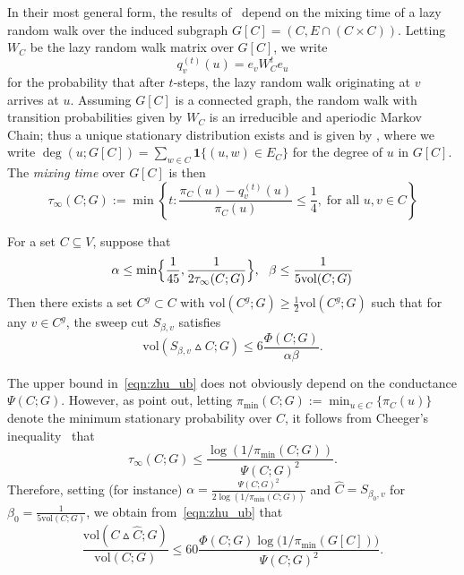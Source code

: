 \documentclass[11pt,twoside]{article}
\newcommand{\set}[1]{\left\{#1\right\}}
\newcommand{\1}{\mathbf{1}}
\newcommand{\wh}[1]{\widehat{#1}}
\newcommand{\vol}{\mathrm{vol}}
\begin{document}
In their most general form, the results of~\citet{zhu2013} depend on the mixing time of a lazy random walk over the induced subgraph $G[C] = (C, E \cap (C \times C))$. Letting 
$W_C$ be the lazy random walk matrix over $G[C]$, we write  
\begin{equation*}
q_{v}^{(t)}(u) = e_vW_C^t e_u
\end{equation*}
for the probability that after $t$-steps, the lazy random walk originating at $v$ arrives at $u$. Assuming $G[C]$ is a connected graph, the random walk with transition probabilities given by $W_C$ is an irreducible and aperiodic Markov Chain; thus a unique stationary distribution exists and is given by \smash{$\pi_C(u) := \deg(u;G[C])/\vol(C;
	G[C])$}, where we write $\deg(u;G[C]) = \sum_{w \in C} \1\{(u,w) \in E_C\}$ for
the degree of $u$ in $G[C]$. The \emph{mixing time} over $G[C]$ is then
\begin{equation}
\label{eqn:mixing_time}
\tau_{\infty}(C;G) := \min\set{ t: \frac{\pi_C(u) - q_{v}^{(t)}(u)}
	{\pi_C(u)} \leq \frac{1}{4}, \; \text{for all $u,v \in C$}}
\end{equation}
\begin{lemma}
	\label{lem:zhu}
	For a set $C \subseteq V$, suppose that
	\begin{equation}
	\label{eqn:zhu_condition}
	\alpha \leq \min\Bigl\{\frac{1}{45}, \frac{1}{2\tau_{\infty}(C;G)}\Bigr\},~~ \beta \leq \frac{1}{5\vol(C;G)}
	\end{equation}
	Then there exists a set $C^g \subset C$ with $\vol(C^g;G) \geq \frac{1}{2}\vol(C^g;G)$ such that for any $v \in C^g$, the sweep cut $S_{\beta,v}$ satisfies
	\begin{equation}
	\label{eqn:zhu_ub}
	\vol(S_{\beta,v} \vartriangle C;G) \leq 6\frac{\Phi(C;G)}{\alpha \beta}.
	\end{equation}
\end{lemma}
The upper bound in~\eqref{eqn:zhu_ub} does not obviously depend on the conductance $\Psi(C;G)$. However, as \cite{zhu2013} point out, letting $\pi_{\min}(C;G) := \min_{u \in C}\{\pi_C(u)\}$ denote the minimum stationary probability over $C$, it follows from Cheeger's inequality~\citep{chung1997} that 
\begin{equation}
\label{eqn:mixing_time_cheeger}
\tau_{\infty}(C;G) \leq \frac{\log(1/\pi_{\min}(C;G))}{\Psi(C;G)^2}.
\end{equation}
Therefore, setting (for instance) $\alpha = \frac{\Psi(C;G)^2}{2\log(1/\pi_{\min}(C;G))}$ and $\wh{C} = S_{\beta_0,v}$ for $\beta_0 = \frac{1}{5 \vol(C;G)}$, we obtain from~\eqref{eqn:zhu_ub} that 
\begin{equation}
\label{eqn:zhu_ub2}
\frac{\vol(C \vartriangle \wh{C};G)}{\vol(C; G)} \leq 60\frac{\Phi(C;G) \log\bigl( 1/\pi_{\min}(G[C])\bigr)}{\Psi(C;G)^2}.
\end{equation}
\end{document}
